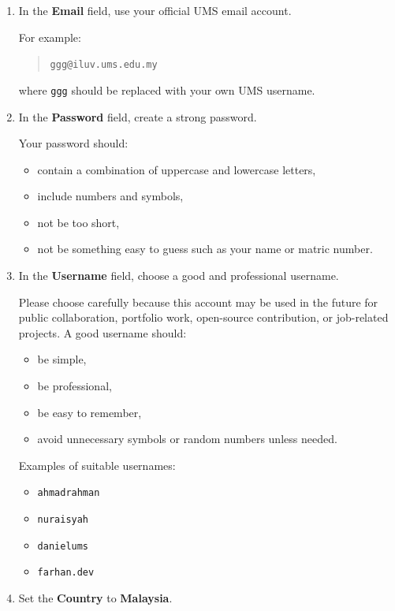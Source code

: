 \begin{enumerate}
    \item In the \textbf{Email} field, use your official UMS email account.

    For example:
    \begin{quote}
        \texttt{ggg@iluv.ums.edu.my}
    \end{quote}
    where \texttt{ggg} should be replaced with your own UMS username.

    \item In the \textbf{Password} field, create a strong password.

    Your password should:
    \begin{itemize}
        \item contain a combination of uppercase and lowercase letters,
        \item include numbers and symbols,
        \item not be too short,
        \item not be something easy to guess such as your name or matric number.
    \end{itemize}

    \item In the \textbf{Username} field, choose a good and professional username.

    Please choose carefully because this account may be used in the future for public collaboration, portfolio work, open-source contribution, or job-related projects. A good username should:
    \begin{itemize}
        \item be simple,
        \item be professional,
        \item be easy to remember,
        \item avoid unnecessary symbols or random numbers unless needed.
    \end{itemize}

    Examples of suitable usernames:
    \begin{itemize}
        \item \texttt{ahmadrahman}
        \item \texttt{nuraisyah}
        \item \texttt{danielums}
        \item \texttt{farhan.dev}
    \end{itemize}

    \item Set the \textbf{Country} to \textbf{Malaysia}.


\end{enumerate}
